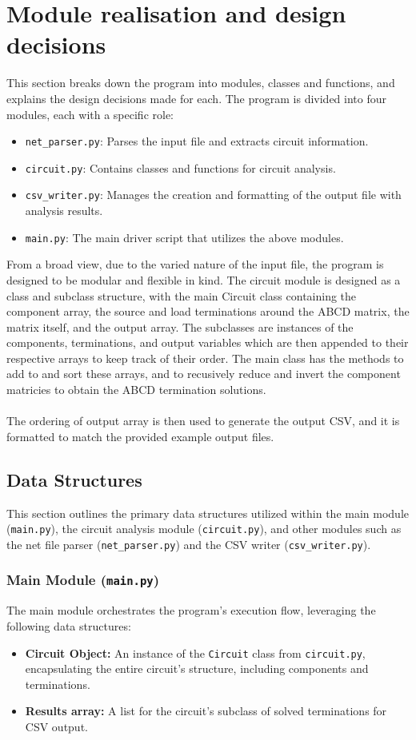 \documentclass[conference]{IEEEtran}
\begin{document}
\section{Module realisation and design decisions}
This section breaks down the program into modules, classes and functions, and explains the design decisions made for each.
The program is divided into four modules, each with a specific role:
\begin{itemize}
    \item \texttt{net\_parser.py}: Parses the input file and extracts circuit information.
    \item \texttt{circuit.py}: Contains classes and functions for circuit analysis.
    \item \texttt{csv\_writer.py}: Manages the creation and formatting of the output file with analysis results.
    \item \texttt{main.py}: The main driver script that utilizes the above modules.
\end{itemize}

From a broad view, due to the varied nature of the input file, the program is designed to be modular and flexible in kind. The circuit module is
designed as a class and subclass structure, with the main Circuit class containing the component array, the source and load terminations around the ABCD matrix, the matrix itself, and the output array.
The subclasses are instances of the components, terminations, and output variables which are then appended to their respective arrays to keep track of their order.
The main class has the methods to add to and sort these arrays, and to recusively reduce and invert the component matricies to obtain the ABCD termination solutions.
\\\\
The ordering of output array is then used to generate the output CSV, and it is formatted to match the provided example output files. 

\subsection{\textbf{Data Structures}}
This section outlines the primary data structures utilized within the main module (\texttt{main.py}), the circuit analysis module (\texttt{circuit.py}), and other modules such as the net file parser (\texttt{net\_parser.py}) and the CSV writer (\texttt{csv\_writer.py}).

\subsubsection*{\textbf{Main Module} (\texttt{main.py})}
The main module orchestrates the program's execution flow, leveraging the following data structures:
\begin{itemize}
    \item \textbf{Circuit Object:} An instance of the \texttt{Circuit} class from \texttt{circuit.py}, encapsulating the entire circuit's structure, including components and terminations.
    \item \textbf{Results array:} A list for the circuit's subclass of solved terminations for CSV output. 
\end{itemize}
\end{document}
